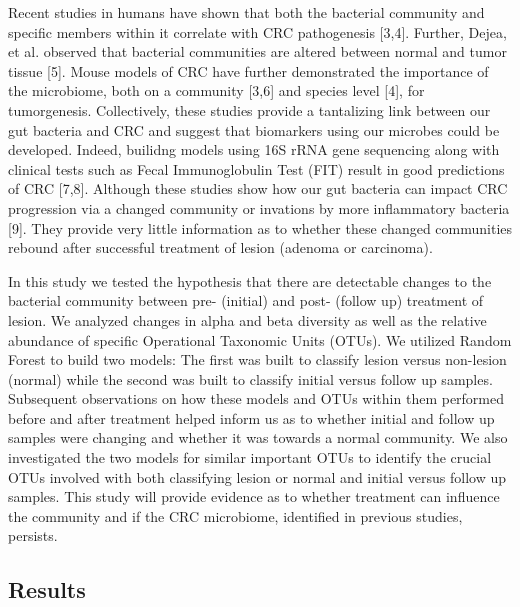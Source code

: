 \documentclass[12pt,]{article}
\begin{document}
Recent studies in humans have shown that both the bacterial community
and specific members within it correlate with CRC pathogenesis
{[}3,4{]}. Further, Dejea, et al. observed that bacterial communities
are altered between normal and tumor tissue {[}5{]}. Mouse models of CRC
have further demonstrated the importance of the microbiome, both on a
community {[}3,6{]} and species level {[}4{]}, for tumorgenesis.
Collectively, these studies provide a tantalizing link between our gut
bacteria and CRC and suggest that biomarkers using our microbes could be
developed. Indeed, builidng models using 16S rRNA gene sequencing along
with clinical tests such as Fecal Immunoglobulin Test (FIT) result in
good predictions of CRC {[}7,8{]}. Although these studies show how our
gut bacteria can impact CRC progression via a changed community or
invations by more inflammatory bacteria {[}9{]}. They provide very
little information as to whether these changed communities rebound after
successful treatment of lesion (adenoma or carcinoma).

In this study we tested the hypothesis that there are detectable changes
to the bacterial community between pre- (initial) and post- (follow up)
treatment of lesion. We analyzed changes in alpha and beta diversity as
well as the relative abundance of specific Operational Taxonomic Units
(OTUs). We utilized Random Forest to build two models: The first was
built to classify lesion versus non-lesion (normal) while the second was
built to classify initial versus follow up samples. Subsequent
observations on how these models and OTUs within them performed before
and after treatment helped inform us as to whether initial and follow up
samples were changing and whether it was towards a normal community. We
also investigated the two models for similar important OTUs to identify
the crucial OTUs involved with both classifying lesion or normal and
initial versus follow up samples. This study will provide evidence as to
whether treatment can influence the community and if the CRC microbiome,
identified in previous studies, persists.

\newpage

\subsection{Results}\label{results}
\end{document}
